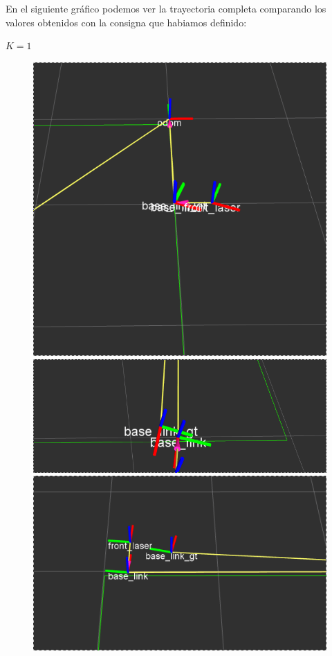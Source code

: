 En el siguiente gráfico podemos ver la trayectoria completa comparando los valores obtenidos con la consigna que habiamos definido:


$K = 1$


\begin{figure}[!htb]
  \includegraphics[width=\linewidth]{imagenesExpLazoCerrado/k1/1.png}
\endminipage\hfill
{}
  \includegraphics[width=\linewidth]{imagenesExpLazoCerrado/k1/3.png}
\endminipage\hfill
{}%
  \includegraphics[width=\linewidth]{imagenesExpLazoCerrado/k1/5.png}
\endminipage
\end{figure}


